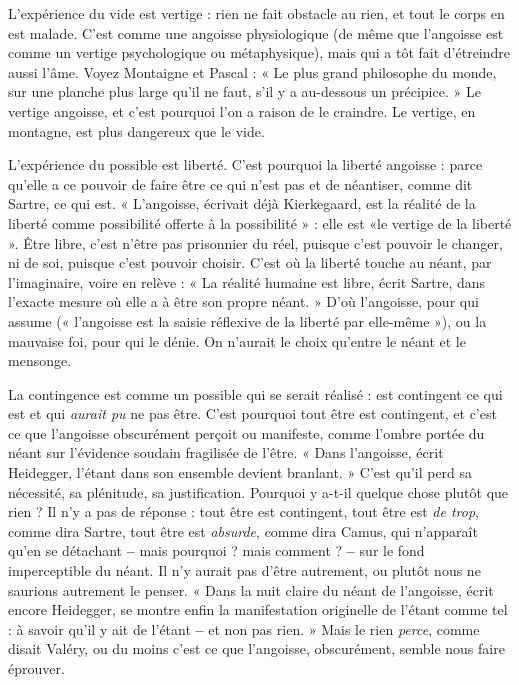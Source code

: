 L'expérience du vide est vertige : rien ne fait obstacle au rien, et tout le
corps en est malade. C’est comme une angoisse physiologique (de même que
l'angoisse est comme un vertige psychologique ou métaphysique), mais qui a
tôt fait d’étreindre aussi l’âme. Voyez Montaigne et Pascal : « Le plus grand
philosophe du monde, sur une planche plus large qu’il ne faut, s’il y a au-dessous
un précipice. » Le vertige angoisse, et c’est pourquoi l’on a raison de le
craindre. Le vertige, en montagne, est plus dangereux que le vide.

L'expérience du possible est liberté. C’est pourquoi la liberté angoisse :
parce qu’elle a ce pouvoir de faire être ce qui n’est pas et de néantiser, comme
dit Sartre, ce qui est. « L’angoisse, écrivait déjà Kierkegaard, est la réalité de la
liberté comme possibilité offerte à la possibilité » : elle est «le vertige de la
liberté ». Être libre, c’est n’être pas prisonnier du réel, puisque c’est pouvoir le
changer, ni de soi, puisque c’est pouvoir choisir. C’est où la liberté touche au
néant, par l'imaginaire, voire en relève : « La réalité humaine est libre, écrit
Sartre, dans l’exacte mesure où elle a à être son propre néant. » D’où l’angoisse,
pour qui assume (« l'angoisse est la saisie réflexive de la liberté par elle-même »),
ou la mauvaise foi, pour qui le dénie. On n’aurait le choix qu’entre le
néant et le mensonge.

La contingence est comme un possible qui se serait réalisé : est contingent
ce qui est et qui {\it aurait pu} ne pas être. C’est pourquoi tout être est contingent,
et c’est ce que l’angoisse obscurément perçoit ou manifeste, comme l’ombre
portée du néant sur l’évidence soudain fragilisée de l’être. « Dans l’angoisse,
écrit Heidegger, l’étant dans son ensemble devient branlant. » C’est qu’il perd
sa nécessité, sa plénitude, sa justification. Pourquoi y a-t-il quelque chose
plutôt que rien ? Il n’y a pas de réponse : tout être est contingent, tout être est
{\it de trop}, comme dira Sartre, tout être est {\it absurde}, comme dira Camus, qui
n'apparaît qu’en se détachant {\bf --} mais pourquoi ? mais comment ? {\bf --} sur le fond
imperceptible du néant. Il n’y aurait pas d’être autrement, ou plutôt nous ne
saurions autrement le penser. « Dans la nuit claire du néant de l’angoisse, écrit
encore Heidegger, se montre enfin la manifestation originelle de l’étant comme
tel : à savoir qu’il y ait de l’étant {\bf --} et non pas rien. » Mais le rien {\it perce}, comme
disait Valéry, ou du moins c’est ce que l'angoisse, obscurément, semble nous
faire éprouver.

